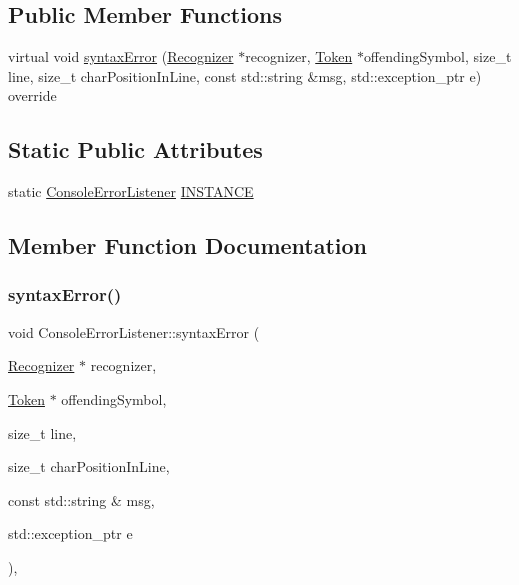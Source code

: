 \subsection*{Public Member Functions}
\begin{DoxyCompactItemize}
\item 
virtual void \hyperlink{classantlr4_1_1ConsoleErrorListener_ac8ba720010f28a83cae7c150c6f1775b}{syntax\+Error} (\hyperlink{classantlr4_1_1Recognizer}{Recognizer} $\ast$recognizer, \hyperlink{classantlr4_1_1Token}{Token} $\ast$offending\+Symbol, size\+\_\+t line, size\+\_\+t char\+Position\+In\+Line, const std\+::string \&msg, std\+::exception\+\_\+ptr e) override
\end{DoxyCompactItemize}
\subsection*{Static Public Attributes}
\begin{DoxyCompactItemize}
\item 
static \hyperlink{classantlr4_1_1ConsoleErrorListener}{Console\+Error\+Listener} \hyperlink{classantlr4_1_1ConsoleErrorListener_a61b93f6c4f075888001972f35698d5ff}{I\+N\+S\+T\+A\+N\+CE}
\end{DoxyCompactItemize}


\subsection{Member Function Documentation}
\mbox{\label{classantlr4_1_1ConsoleErrorListener_ac8ba720010f28a83cae7c150c6f1775b}} 
\subsubsection{\texorpdfstring{syntax\+Error()}{syntaxError()}}
{\footnotesize\ttfamily void Console\+Error\+Listener\+::syntax\+Error (\begin{DoxyParamCaption}\item[{\hyperlink{classantlr4_1_1Recognizer}{Recognizer} $\ast$}]{recognizer,  }\item[{\hyperlink{classantlr4_1_1Token}{Token} $\ast$}]{offending\+Symbol,  }\item[{size\+\_\+t}]{line,  }\item[{size\+\_\+t}]{char\+Position\+In\+Line,  }\item[{const std\+::string \&}]{msg,  }\item[{std\+::exception\+\_\+ptr}]{e }\end{DoxyParamCaption})\hspace{0.3cm}{\ttfamily [override]}, {\ttfamily [virtual]}}

